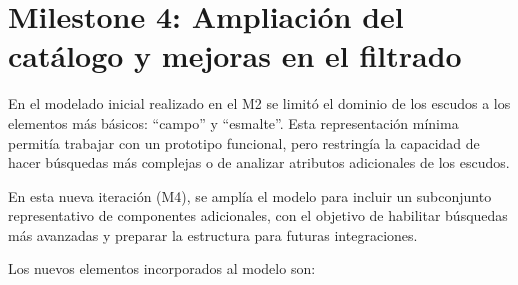 \section{Milestone 4: Ampliación del catálogo y mejoras en el filtrado}
En el modelado inicial realizado en el M2 se limitó el dominio de los escudos a los elementos más 
básicos: ``campo'' y ``esmalte''. Esta representación mínima permitía trabajar con un prototipo funcional, 
pero restringía la capacidad de hacer búsquedas más complejas o de analizar atributos adicionales 
de los escudos.

En esta nueva iteración (M4), se amplía el modelo para incluir un subconjunto representativo de 
componentes adicionales, con el objetivo de habilitar búsquedas más avanzadas y preparar la estructura 
para futuras integraciones.

Los nuevos elementos incorporados al modelo son: 

